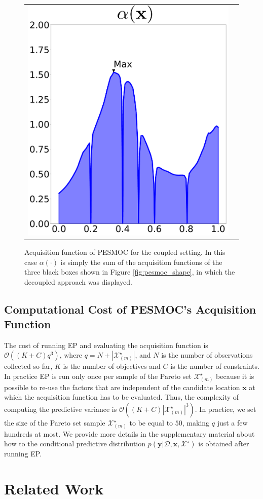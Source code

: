 \documentclass[review,preprint,12pt]{elsarticle}
\begin{document}
\begin{figure}[t]
\begin{center}
\begin{tabular}{cc}
\includegraphics[width=0.3\linewidth]{figures/theory/acq.pdf}
\end{tabular}
\caption{Acquisition function of PESMOC for the coupled setting. In this case $\alpha(\cdot)$ is simply the sum 
	of the acquisition functions of the three black boxes shown in Figure \ref{fig:pesmoc_shape}, in which  the decoupled 
	approach was displayed. }
        \label{fig:pesmoc_coupled_shape}
\end{center}
\end{figure}

\subsection{Computational Cost of PESMOC's Acquisition Function}

The cost of running EP and evaluating the acquisition function is $\mathcal{O}((K+C)q^3)$, 
where $q = N + |\mathcal{X}_{(m)}^{\star}|$, and $N$ is the number of observations collected so far, 
$K$ is the number of objectives and $C$ is the number of constraints. 
In practice EP is run only once per sample of the Pareto set $\mathcal{X}_{(m)}^{\star}$ because  
it is possible to re-use the factors that are independent of the candidate location $\mathbf{x}$ at which the acquisition
function has to be evaluated. Thus, the complexity of computing the predictive variance is 
$\mathcal{O}((K+C)|\mathcal{X}_{(m)}^{\star}|^3)$. In practice, we set the size of the Pareto set 
sample $\mathcal{X}_{(m)}^{\star}$ to be equal to $50$, making $q$ just a few hundreds at most.
We provide more details in the supplementary material about how 
to the conditional predictive distribution $p(\textbf{y}|\mathcal{D}, \textbf{x}, \mathcal{X}^{\star})$
is obtained after running EP.

\section{Related Work}
\label{sec:related}
\end{document}
